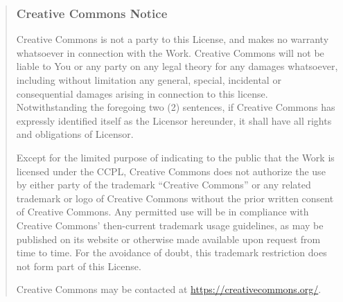 \begin{quotation}
\subsubsection{Creative Commons Notice}
\par Creative Commons is not a party to this License, and
makes no warranty whatsoever in connection with the Work.
Creative Commons will not be liable to You or any party
on any legal theory for any damages whatsoever, including
without limitation any general, special, incidental or
consequential damages arising in connection to this
license. Notwithstanding the foregoing two (2) sentences,
if Creative Commons has expressly identified itself as
the Licensor hereunder, it shall have all rights and
obligations of Licensor.
\par Except for the limited purpose of indicating to the
public that the Work is licensed under the CCPL, Creative
Commons does not authorize the use by either party of the
trademark ``Creative Commons'' or any related trademark or
logo of Creative Commons without the prior written
consent of Creative Commons. Any permitted use will be in
compliance with Creative Commons' then-current trademark
usage guidelines, as may be published on its website or
otherwise made available upon request from time to time.
For the avoidance of doubt, this trademark restriction
does not form part of this License.
\par Creative Commons may be contacted at \url{https://creativecommons.org/}.
\end{quotation}



